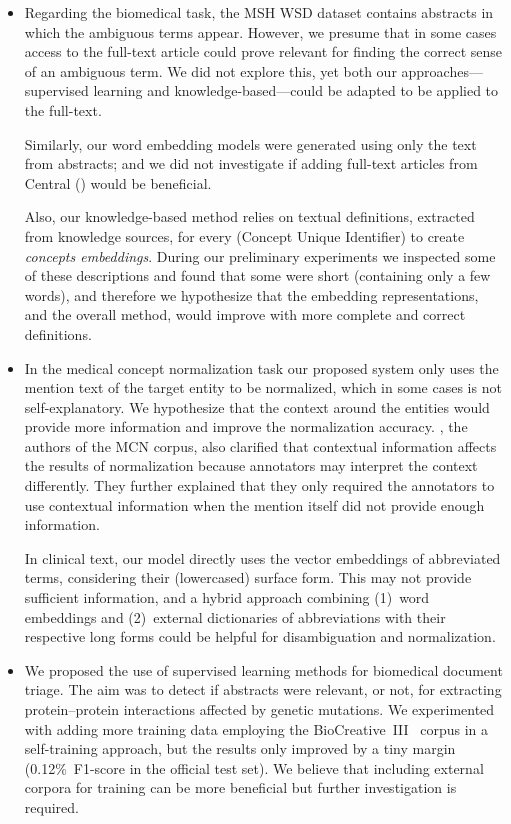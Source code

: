 \begin{itemize}

\item
Regarding the biomedical  task, the MSH WSD dataset contains  abstracts in which the ambiguous terms appear.
However, we presume that in some cases access to the full-text article could prove relevant for finding the correct sense of an ambiguous term.
We did not explore this, yet both our approaches---supervised learning and knowledge-based---could be adapted to be applied to the full-text.

Similarly, our word embedding models were generated using only the text from  abstracts; and we did not investigate if adding full-text articles from  Central () would be beneficial.

Also, our knowledge-based method relies on textual definitions, extracted from  knowledge sources, for every  (Concept Unique Identifier) to create \textit{concepts embeddings}.
During our preliminary experiments we inspected some of these descriptions and found that some were short (containing only a few words), and therefore we hypothesize that the embedding representations, and the overall method, would improve with more complete and correct definitions.

\item
In the medical concept normalization task our proposed system only uses the mention text of the target entity to be normalized, which in some cases is not self-explanatory.
We hypothesize that the context around the entities would provide more information and improve the normalization accuracy.
\textcite{luo2019a}, the authors of the MCN corpus, also clarified that contextual information affects the results of normalization because annotators may interpret the context differently.
They further explained that they only required the annotators to use contextual information when the mention itself did not provide enough information.

In clinical text, our model directly uses the vector embeddings of abbreviated terms, considering their (lowercased) surface form.
This may not provide sufficient information, and a hybrid approach combining (1)~word embeddings and (2)~external dictionaries of abbreviations with their respective long forms could be helpful for disambiguation and normalization.

\item
We proposed the use of supervised learning methods for biomedical document triage.
The aim was to detect if  abstracts were relevant, or not, for extracting protein--protein interactions affected by genetic mutations.
We experimented with adding more training data employing the BioCreative~III~ corpus \parencite{krallinger2011a} in a self-training approach, but the results only improved by a tiny margin (0.12\%~F1-score in the official test set).
We believe that including external corpora for training can be more beneficial but further investigation is required.


\end{itemize}
